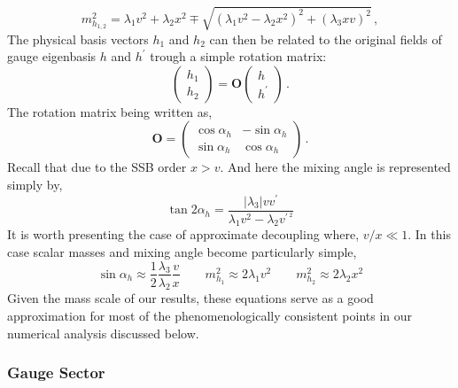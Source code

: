 \begin{equation}
m_{h_{1,2}}^2 = \lambda_1 v^2 + \lambda_2 x^2 \mp \sqrt{(\lambda_1 v^2 - \lambda_2 x^2)^2 + (\lambda_3 x v)^2}\,,
\label{eq:eigvals}
\end{equation}
The physical basis vectors $h_1$ and $h_2$ can then be related to the original fields of gauge eigenbasis $h$ and $h^\prime$ trough a simple rotation matrix:
%
\begin{equation}
	\begin{pmatrix}
	h_1 \\
	h_2 
	\end{pmatrix}
	=
	\mathbf{O}
	\begin{pmatrix}
	h \\
	h^\prime 
	\end{pmatrix}\,.
	\label{eq:trans}
\end{equation}
%
The rotation matrix being written as, 
%
\begin{equation}
	\mathbf{O} = 
	\begin{pmatrix}
	\cos \alpha_h & -\sin \alpha_h \\
	\sin \alpha_h & \cos \alpha_h 
	\end{pmatrix}\,.
	\label{eq:rotmat}
\end{equation}
%
Recall that due to the SSB order $x > v$. { \color{blue} And here the mixing angle is represented simply by, 
\begin{equation}
\tan 2 \alpha_h   = \frac{ \left| \lambda_3 \right|  v v^\prime }{\lambda_1 v^2 - \lambda_2 v^{\prime\,^2} } 
\end{equation} }
It is worth presenting the case of approximate decoupling where, $v/x\ll 1$. In this case scalar masses and mixing angle become particularly simple,
\begin{equation}
\sin \alpha_h \approx \dfrac{1}{2}\dfrac{\lambda_3}{\lambda_2} \dfrac{v}{x} \qquad
m_{h_1}^2 \approx 2 \lambda_1 v^2 \qquad m_{h_2}^2 \approx 2 \lambda_2 x^2
\label{eq:simplify}
\end{equation}
Given the mass scale of our results, these equations serve as a good 
approximation for most of the phenomenologically consistent points 
in our numerical analysis discussed below.

\subsubsection{Gauge Sector}

